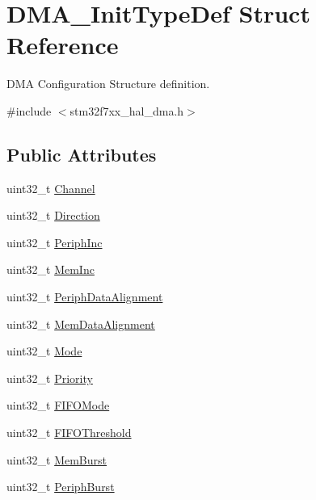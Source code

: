 \hypertarget{struct_d_m_a___init_type_def}{}\section{D\+M\+A\+\_\+\+Init\+Type\+Def Struct Reference}
\label{struct_d_m_a___init_type_def}


D\+MA Configuration Structure definition.  




{\ttfamily \#include $<$stm32f7xx\+\_\+hal\+\_\+dma.\+h$>$}

\subsection*{Public Attributes}
\begin{DoxyCompactItemize}
\item 
uint32\+\_\+t \mbox{\hyperlink{struct_d_m_a___init_type_def_af62608eb25864208cae5d59acef282a6}{Channel}}
\item 
uint32\+\_\+t \mbox{\hyperlink{struct_d_m_a___init_type_def_a0145b5d0e074fa8e2e185ecf2c4a15ca}{Direction}}
\item 
uint32\+\_\+t \mbox{\hyperlink{struct_d_m_a___init_type_def_a46811eb656170cb5c542054d1a41db3a}{Periph\+Inc}}
\item 
uint32\+\_\+t \mbox{\hyperlink{struct_d_m_a___init_type_def_a49b187ba5ab8ba4354e02837e8b99414}{Mem\+Inc}}
\item 
uint32\+\_\+t \mbox{\hyperlink{struct_d_m_a___init_type_def_a10a4a549953efa20c235dcbb381b6f0b}{Periph\+Data\+Alignment}}
\item 
uint32\+\_\+t \mbox{\hyperlink{struct_d_m_a___init_type_def_a7784efedc4a61325fa7364fcace10136}{Mem\+Data\+Alignment}}
\item 
uint32\+\_\+t \mbox{\hyperlink{struct_d_m_a___init_type_def_adbbca090b53d32ac93cc7359b7994db2}{Mode}}
\item 
uint32\+\_\+t \mbox{\hyperlink{struct_d_m_a___init_type_def_af110cc02c840207930e3c0e5de5d7dc4}{Priority}}
\item 
uint32\+\_\+t \mbox{\hyperlink{struct_d_m_a___init_type_def_acda0396cf55baab166f51b1ea1deed0d}{F\+I\+F\+O\+Mode}}
\item 
uint32\+\_\+t \mbox{\hyperlink{struct_d_m_a___init_type_def_a2f994cc2979b82cd215e9f38edbbc6ed}{F\+I\+F\+O\+Threshold}}
\item 
uint32\+\_\+t \mbox{\hyperlink{struct_d_m_a___init_type_def_ad5e266a0b90f58365e21c349654bc68d}{Mem\+Burst}}
\item 
uint32\+\_\+t \mbox{\hyperlink{struct_d_m_a___init_type_def_a3fbfe4dd664e24845dc75f5c8f43b5a3}{Periph\+Burst}}
\end{DoxyCompactItemize}


